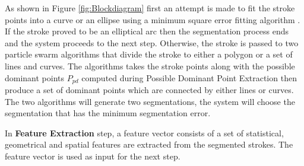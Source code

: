  As shown in Figure \ref{fig:Blockdiagram} first an attempt is made to fit the stroke points into a curve or an ellipse using a minimum square error fitting algorithm \cite{chernov}. If the stroke proved to be an elliptical arc then the segmentation process ends and the system proceeds to the next step. Otherwise, the stroke is passed to two particle swarm algorithms that divide the stroke to either a polygon or a set of lines and curves. The algorithms takes the stroke points along with the possible dominant points $P_{pd}$ computed during Possible Dominant Point Extraction then produce a set of dominant points which are connected by either lines or curves. The two algorithms will generate two segmentations, the system will choose the segmentation that has the minimum segmentation error.%


 
 In \textbf{Feature Extraction} step, a feature vector consists of a set of statistical, geometrical and spatial features are extracted from the segmented strokes. The feature vector is used as input for the next step.   %
  
